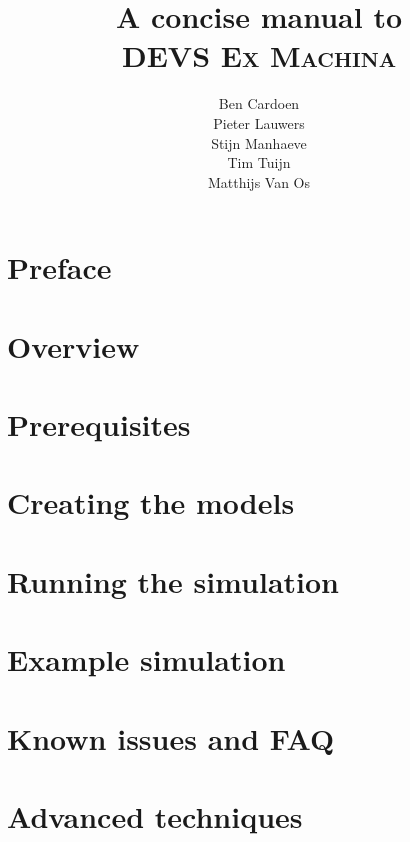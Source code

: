 \documentclass[10pt,a4paper]{report}
\title{A concise manual to\\\textsc{DEVS Ex Machina}}
\author{Ben Cardoen\\Pieter Lauwers\\Stijn Manhaeve\\Tim Tuijn\\Matthijs Van Os}
\date{}
\begin{document}
\maketitle
\tableofcontents{}
\chapter*{Preface}


\chapter{Overview}


\chapter{Prerequisites}

\chapter{Creating the models}


\chapter{Running the simulation}


\appendix
\chapter{Example simulation}

\chapter{Known issues and FAQ}

\chapter{Advanced techniques}
\end{document}
